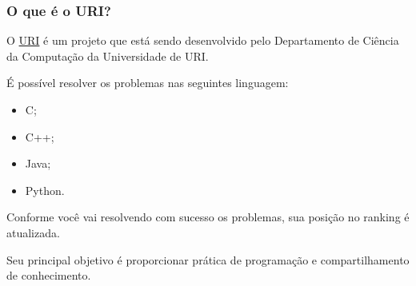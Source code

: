 \begin{frame}
 \frametitle{O que é o URI?}
 O \href{https://www.urionlinejudge.com.br/}{URI} é um projeto que está sendo desenvolvido
 pelo Departamento de Ciência da Computação da Universidade de URI.
 
 É possível resolver os problemas nas seguintes linguagem:
 \begin{itemize}
  \item C;
  \item C++;
  \item Java;
  \item Python.
 \end{itemize}
 Conforme você vai resolvendo com sucesso os problemas, sua posição no ranking é atualizada.
 
 Seu principal objetivo é proporcionar prática de programação e compartilhamento de conhecimento.
\end{frame}
